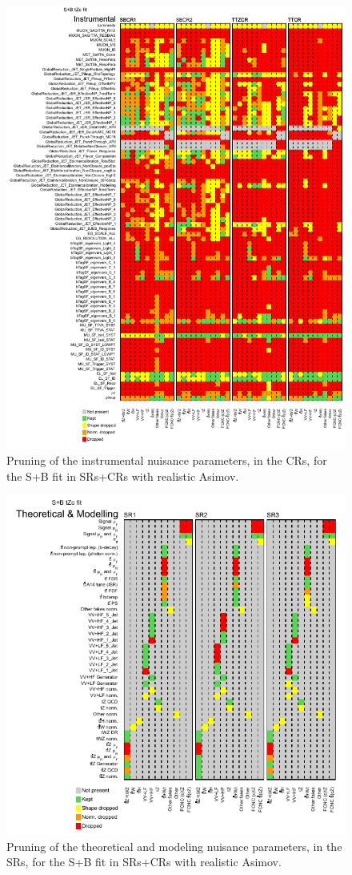 \begin{figure}[htbp]
	\centering
	\includegraphics[width=.9\textwidth]{Chapters/CH8/figures/SPLUSB_CRSR_UsingDL1rcFullSys/pruning_split2}
	\caption{Pruning of the instrumental nuisance parameters, in the CRs, for the S+B \tZc fit in SRs+CRs with realistic Asimov.}%
	\label{fig:stat:tzc:splusb:crsr:pruning2}
\end{figure}
\begin{figure}[htbp]
	\centering
	\includegraphics[width=.65\textwidth]{Chapters/CH8/figures/SPLUSB_CRSR_UsingDL1rcFullSys/pruning_split3}
	\caption{Pruning of the theoretical and modeling nuisance parameters, in the SRs, for the S+B \tZc fit in SRs+CRs with realistic Asimov.}%
	\label{fig:stat:tzc:splusb:crsr:pruning3}
\end{figure}
